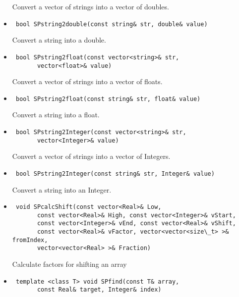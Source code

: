 \documentclass[11pt]{book}
\begin{document}
\begin{itemize}
          Convert a vector of strings into a vector of doubles.

\item  \begin{verbatim} bool SPstring2double(const string& str, double& value) \end{verbatim}

          Convert a string into a double.

\item  \begin{verbatim} bool SPstring2float(const vector<string>& str, 
       vector<float>& value) \end{verbatim}

          Convert a vector of strings into a vector of floats.

\item  \begin{verbatim} bool SPstring2float(const string& str, float& value) \end{verbatim}

          Convert a string into a float.

\item  \begin{verbatim} bool SPstring2Integer(const vector<string>& str, 
       vector<Integer>& value) \end{verbatim}

          Convert a vector of strings into a vector of Integers.

\item  \begin{verbatim} bool SPstring2Integer(const string& str, Integer& value) \end{verbatim}

          Convert a string into an Integer.

\item  \begin{verbatim} void SPcalcShift(const vector<Real>& Low, 
       const vector<Real>& High, const vector<Integer>& vStart, 
       const vector<Integer>& vEnd, const vector<Real>& vShift, 
       const vector<Real>& vFactor, vector<vector<size\_t> >& fromIndex, 
       vector<vector<Real> >& Fraction) \end{verbatim}

          Calculate factors for shifting an array

\item  \begin{verbatim} template <class T> void SPfind(const T& array, 
       const Real& target, Integer& index)\end{verbatim}


\end{itemize}
\end{document}
